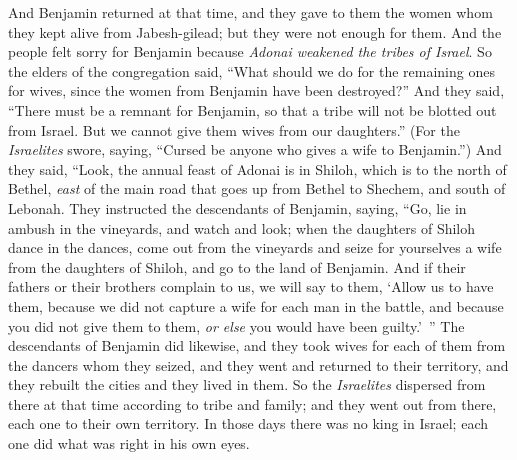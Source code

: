 \begin{biblechapter}
\verse And Benjamin returned at that time, and they gave to them the women whom they kept alive from Jabesh-gilead; but they were not enough for them.
\verse And the people felt sorry for Benjamin because \textit{Adonai weakened the tribes of Israel}.
\verse So the elders of the congregation said, “What should we do for the remaining ones for wives, since the women from Benjamin have been destroyed?”
\verse And they said, “There must be a remnant for Benjamin, so that a tribe will not be blotted out from Israel.
\verse But we cannot give them wives from our daughters.” (For the \textit{Israelites} swore, saying, “Cursed be anyone who gives a wife to Benjamin.”)
\verse And they said, “Look, the annual feast of Adonai is in Shiloh, which is to the north of Bethel, \textit{east} of the main road that goes up from Bethel to Shechem, and south of Lebonah.
\verse They instructed the descendants of Benjamin, saying, “Go, lie in ambush in the vineyards,
\verse and watch and look; when the daughters of Shiloh dance in the dances, come out from the vineyards and seize for yourselves a wife from the daughters of Shiloh, and go to the land of Benjamin.
\verse And if their fathers or their brothers complain to us, we will say to them, ‘Allow us to have them, because we did not capture a wife for each man in the battle, and because you did not give them to them, \textit{or else} you would have been guilty.’ ”
\verse The descendants of Benjamin did likewise, and they took wives for each of them from the dancers whom they seized, and they went and returned to their territory, and they rebuilt the cities and they lived in them.
\verse So the \textit{Israelites} dispersed from there at that time according to tribe and family; and they went out from there, each one to their own territory.
\verse In those days there was no king in Israel; each one did what was right in his own eyes.
\end{biblechapter}

